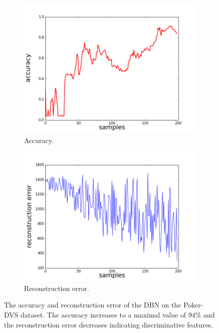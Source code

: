 \begin{figure}[h!]
	\centering
	\begin{subfigure}[t]{.45\textwidth}
  		\centering
  		\includegraphics[width=.9\linewidth]{imgs/poker/acc.png}
  		\caption{Accuracy.}
  		\label{fig:sub1}
	\end{subfigure}%
	\begin{subfigure}[t]{.45\textwidth}
  		\centering
  		\includegraphics[width=.9\linewidth]{imgs/poker/recon_err.png}
  		\caption{Reconstruction error.}
  		\label{fig:sub2}
	\end{subfigure}
	\caption[The accuracy and reconstruction error of the DBN on the Poker-DVS dataset.]{The accuracy and reconstruction error of the DBN on the Poker-DVS dataset. The accuracy increases to a maximal value of $94 \%$ and the reconstruction error decreases indicating discriminative features. }
	\label{fig:poker_err}
\end{figure}


